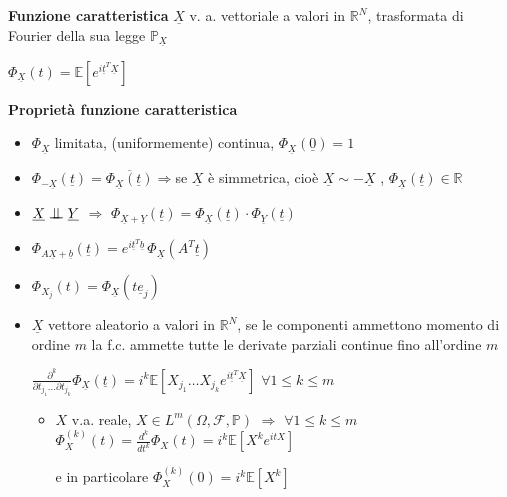 \documentclass[openany]{book} %
\newcommand{\ind}{\mathrel{\text{\scalebox{1.07}{$\perp\mkern-10mu\perp$}}}}
\begin{document}
\textbf{Funzione caratteristica} $\underline{X}$ v. a. vettoriale a valori in $\mathbb{R}^N$, trasformata di Fourier della sua legge $\mathbb{P}_{\underline{X}}$

$\Phi_{\underline{X}}(t)=\mathbb{E}\left[e^{i \underline{t}^T \underline{X}}\right]$

\textbf{Proprietà funzione caratteristica}

\begin{itemize}

	\item $\Phi_{\underline{X}}$ limitata, (uniformemente) continua, $\Phi_{\underline{X}}(\underline{0})=1$

	\item $\Phi_{-\underline{X}}(\underline{t}) = \overline{\Phi_{\underline{X}}(\underline{t})}$\quad$ \Rightarrow$\quad se $\underline{X}$ è simmetrica, cioè $\underline{X}\sim-\underline{X}$ , \quad $\Phi_{\underline{X}}(\underline{t})\in \mathbb{R}$

	\item $\underline{X}\ind \underline{Y}$ \quad $\Rightarrow$ \quad $\Phi_{\underline{X}+\underline{Y}}(\underline{t})=\Phi_{\underline{X}}(\underline{t})\cdot\Phi_{\underline{Y}}(\underline{t})$

	\item $\Phi_{A\underline{X}+\underline{b}}(\underline{t})= e^{i \underline{t}^T \underline{b}}\,\Phi_{\underline{X}}(A^T\underline{t})$

	\item $\Phi_{X_j}(t) = \Phi_{\underline{X}}(t\underline{e}_j)$

	\item $\underline{X}$ vettore aleatorio a valori in $\mathbb{R}^N$, se le componenti ammettono momento di ordine $m$ la f.c. ammette tutte le derivate parziali continue fino all'ordine $m$

	      $\frac{\partial^k}{\partial t_{j_1}\dots\partial t_{j_k}}\Phi_{\underline{X}}(\underline{t}) =i^k \mathbb{E}\left[X_{j_1}\dots X_{j_k}e^{i \underline{t}^T \underline{X}}\right]$ \quad $\forall 1\leq k\leq m$

	      \begin{itemize}

		      \item $X$ v.a. reale, $X\in L^m(\Omega,\mathcal{F},\mathbb{P})$ \quad $\Rightarrow$ \quad $ \forall 1\leq k \leq m$ \quad $\Phi_X^{(k)}(t)=\frac{d^k}{dt^k}\Phi_X(t)=i^k \mathbb{E}\left[X^ke^{itX}\right]$

		            e in particolare $\Phi_X^{(k)}(0)=i^k \mathbb{E}\left[X^k\right]$


\end{itemize}
\end{itemize}
\end{document}
